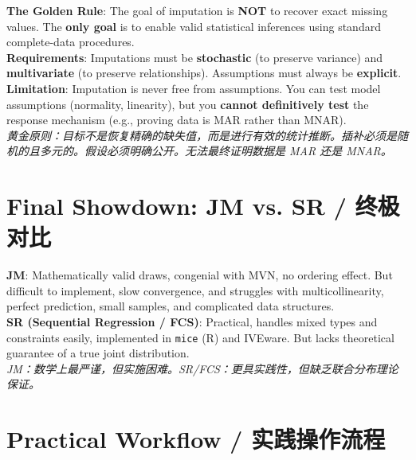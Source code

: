 \documentclass[9pt, a4paper]{article}
\begin{document}
\begin{tcolorbox}[summarybox]
    \textbf{The Golden Rule}: The goal of imputation is \textbf{NOT} to recover exact missing values. The \textbf{only goal} is to enable valid statistical inferences using standard complete-data procedures.\\[3pt]
    \textbf{Requirements}: Imputations must be \textbf{stochastic} (to preserve variance) and \textbf{multivariate} (to preserve relationships). Assumptions must always be \textbf{explicit}.\\[3pt]
    \textbf{Limitation}: Imputation is never free from assumptions. You can test model assumptions (normality, linearity), but you \textbf{cannot definitively test} the response mechanism (e.g., proving data is MAR rather than MNAR).\\[3pt]
    \textit{黄金原则：目标不是恢复精确的缺失值，而是进行有效的统计推断。插补必须是随机的且多元的。假设必须明确公开。无法最终证明数据是 MAR 还是 MNAR。}
\end{tcolorbox}

\section{Final Showdown: JM vs. SR / 终极对比}

\begin{tcolorbox}[defbox]
    \textbf{JM}: Mathematically valid draws, congenial with MVN, no ordering effect. But difficult to implement, slow convergence, and struggles with multicollinearity, perfect prediction, small samples, and complicated data structures.\\[3pt]
    \textbf{SR (Sequential Regression / FCS)}: Practical, handles mixed types and constraints easily, implemented in \texttt{mice} (R) and IVEware. But lacks theoretical guarantee of a true joint distribution.\\[3pt]
    \textit{JM：数学上最严谨，但实施困难。SR/FCS：更具实践性，但缺乏联合分布理论保证。}
\end{tcolorbox}

\section{Practical Workflow / 实践操作流程}
\end{document}
